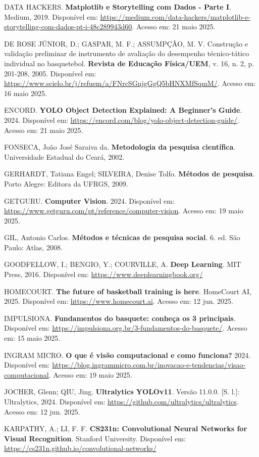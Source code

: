\begin{flushleft}
DATA HACKERS. \textbf{Matplotlib e Storytelling com Dados - Parte I}. Medium, 2019. Disponível em: \url{https://medium.com/data-hackers/matplotlib-e-storytelling-com-dados-pt-i-48c289943d60}. Acesso em: 21 maio 2025.

DE ROSE JÚNIOR, D.; GASPAR, M. F.; ASSUMPÇÃO, M. V. Construção e validação preliminar de instrumento de avaliação do desempenho técnico-tático individual no basquetebol. \textbf{Revista de Educação Física/UEM}, v. 16, n. 2, p. 201-208, 2005. Disponível em: \url{https://www.scielo.br/j/refuem/a/FNrcSGnjgGgQ5bHNXMfSqmM/}. Acesso em: 16 maio 2025.

ENCORD. \textbf{YOLO Object Detection Explained: A Beginner's Guide}. 2024. Disponível em: \url{https://encord.com/blog/yolo-object-detection-guide/}. Acesso em: 21 maio 2025.

FONSECA, João José Saraiva da. \textbf{Metodologia da pesquisa científica}. Universidade Estadual do Ceará, 2002.

GERHARDT, Tatiana Engel; SILVEIRA, Denise Tolfo. \textbf{Métodos de pesquisa}. Porto Alegre: Editora da UFRGS, 2009.

GETGURU. \textbf{Computer Vision}. 2024. Disponível em: \url{https://www.getguru.com/pt/reference/computer-vision}. Acesso em: 19 maio 2025.

GIL, Antonio Carlos. \textbf{Métodos e técnicas de pesquisa social}. 6. ed. São Paulo: Atlas, 2008.

GOODFELLOW, I.; BENGIO, Y.; COURVILLE, A. \textbf{Deep Learning}. MIT Press, 2016. Disponível em: \url{https://www.deeplearningbook.org/}

HOMECOURT. \textbf{The future of basketball training is here}. HomeCourt AI, 2025. Disponível em: \url{https://www.homecourt.ai}. Acesso em: 12 jun. 2025.

IMPULSIONA. \textbf{Fundamentos do basquete: conheça os 3 principais}. Disponível em: \url{https://impulsiona.org.br/3-fundamentos-do-basquete/}. Acesso em: 15 maio 2025.

INGRAM MICRO. \textbf{O que é visão computacional e como funciona?} 2024. Disponível em: \url{https://blog.ingrammicro.com.br/inovacao-e-tendencias/visao-computacional}. Acesso em: 19 maio 2025.

JOCHER, Glenn; QIU, Jing. \textbf{Ultralytics YOLOv11}. Versão 11.0.0. [S. l.]: Ultralytics, 2024. Disponível em: \url{https://github.com/ultralytics/ultralytics}. Acesso em: 12 jun. 2025.

KARPATHY, A.; LI, F. F. \textbf{CS231n: Convolutional Neural Networks for Visual Recognition}. Stanford University. Disponível em: \url{https://cs231n.github.io/convolutional-networks/}


\end{flushleft}
